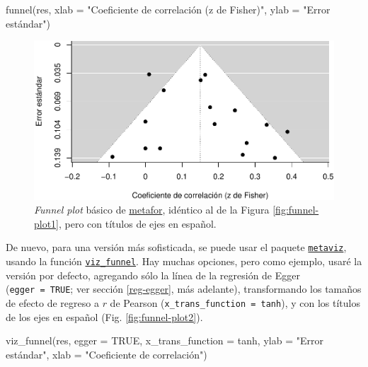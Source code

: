 \documentclass[
  bookmarksnumbered]{article}
\newenvironment{Shaded}{\begin{snugshade}}{\end{snugshade}}
\newcommand{\AttributeTok}[1]{\textcolor[rgb]{0.00,0.34,0.68}{#1}}
\newcommand{\ConstantTok}[1]{\textcolor[rgb]{0.67,0.33,0.00}{#1}}
\newcommand{\FunctionTok}[1]{\textcolor[rgb]{0.39,0.29,0.61}{#1}}
\newcommand{\NormalTok}[1]{\textcolor[rgb]{0.12,0.11,0.11}{#1}}
\newcommand{\StringTok}[1]{\textcolor[rgb]{0.75,0.01,0.01}{#1}}
\begin{document}
\begin{Shaded}
\begin{Highlighting}[]
\FunctionTok{funnel}\NormalTok{(res, }
       \AttributeTok{xlab =} \StringTok{"Coeficiente de correlación (z de Fisher)"}\NormalTok{,}
       \AttributeTok{ylab =} \StringTok{"Error estándar"}\NormalTok{)}
\end{Highlighting}
\end{Shaded}

\begin{figure}
\centering
\includegraphics{Meta-analysis_files/figure-latex/funnel-plot1a-1.pdf}
\caption{\label{fig:funnel-plot1a}\emph{Funnel plot} básico de \href{https://www.metafor-project.org/doku.php}{metafor}, idéntico al de la Figura \ref{fig:funnel-plot1}, pero con títulos de ejes en español.}
\end{figure}

De nuevo, para una versión más sofisticada, se puede usar el paquete \href{https://cran.r-project.org/web/packages/metaviz/vignettes/metaviz.html}{\texttt{metaviz}}, usando la función \href{https://cran.r-project.org/web/packages/metaviz/vignettes/metaviz.html\#creating-funnel-plots-with-viz_funnel}{\texttt{viz\_funnel}}. Hay muchas opciones, pero como ejemplo, usaré la versión por defecto, agregando sólo la línea de la regresión de Egger (\texttt{egger\ =\ TRUE}; ver sección \ref{reg-egger}, más adelante), transformando los tamaños de efecto de regreso a \(r\) de Pearson (\texttt{x\_trans\_function\ =\ tanh}), y con los títulos de los ejes en español (Fig. \ref{fig:funnel-plot2}).

\begin{Shaded}
\begin{Highlighting}[]
\FunctionTok{viz\_funnel}\NormalTok{(res, }
           \AttributeTok{egger =} \ConstantTok{TRUE}\NormalTok{,}
           \AttributeTok{x\_trans\_function =}\NormalTok{ tanh,}
           \AttributeTok{ylab =} \StringTok{"Error estándar"}\NormalTok{,}
           \AttributeTok{xlab =} \StringTok{"Coeficiente de correlación"}\NormalTok{)}
\end{Highlighting}
\end{Shaded}
\end{document}
